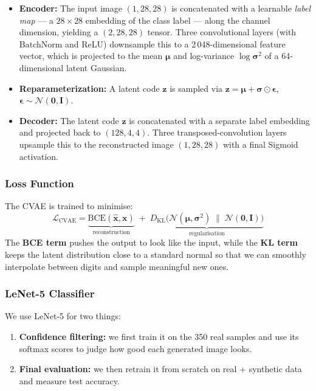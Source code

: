 \documentclass[12pt, a4paper]{article}
\begin{document}
\begin{itemize}
    \item \textbf{Encoder:} The input image $(1, 28, 28)$ is concatenated with a learnable
          \emph{label map} --- a $28 \times 28$ embedding of the class label --- along the
          channel dimension, yielding a $(2, 28, 28)$ tensor.  Three convolutional layers
          (with BatchNorm and ReLU) downsample this to a 2\,048-dimensional feature vector,
          which is projected to the mean $\boldsymbol{\mu}$ and log-variance
          $\log \boldsymbol{\sigma}^{2}$ of a 64-dimensional latent Gaussian.

    \item \textbf{Reparameterization:} A latent code $\mathbf{z}$ is sampled via
          $\mathbf{z} = \boldsymbol{\mu} + \boldsymbol{\sigma} \odot \boldsymbol{\epsilon}$,
          $\boldsymbol{\epsilon} \sim \mathcal{N}(\mathbf{0}, \mathbf{I})$.

    \item \textbf{Decoder:} The latent code $\mathbf{z}$ is concatenated with a separate
          label embedding and projected back to $(128, 4, 4)$.  Three transposed-convolution
          layers upsample this to the reconstructed image $(1, 28, 28)$ with a final Sigmoid
          activation.
\end{itemize}

\subsubsection{Loss Function}

The CVAE is trained to minimise:
\[
    \mathcal{L}_{\text{CVAE}} = \underbrace{\text{BCE}(\hat{\mathbf{x}}, \mathbf{x})}_{\text{reconstruction}}
    \;+\; \underbrace{D_{\text{KL}}\!\bigl(\mathcal{N}(\boldsymbol{\mu}, \boldsymbol{\sigma}^{2})
    \;\|\; \mathcal{N}(\mathbf{0}, \mathbf{I})\bigr)}_{\text{regularisation}}
\]
The \textbf{BCE term} pushes the output to look like the input, while the \textbf{KL term}
keeps the latent distribution close to a standard normal so that we can smoothly
interpolate between digits and sample meaningful new ones.

\subsubsection{LeNet-5 Classifier}

We use LeNet-5 for two things:
\begin{enumerate}
    \item \textbf{Confidence filtering:} we first train it on the 350 real samples and use
          its softmax scores to judge how good each generated image looks.
    \item \textbf{Final evaluation:} we then retrain it from scratch on real + synthetic
          data and measure test accuracy.
\end{enumerate}
\end{document}
